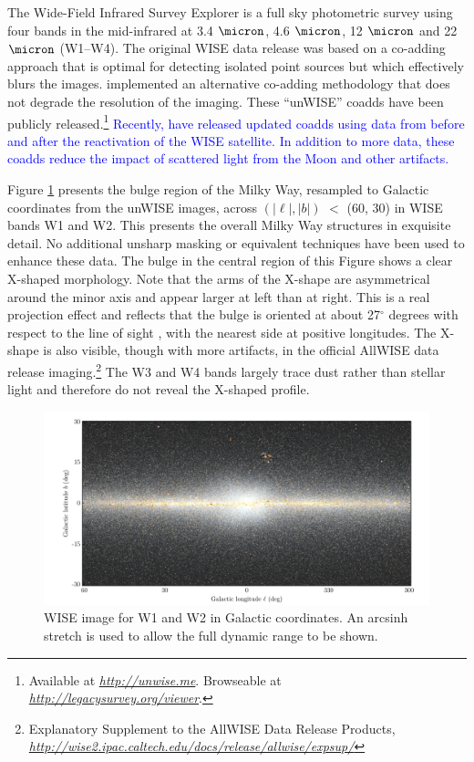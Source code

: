 \documentclass[12pt, preprint]{aastex}
\newcommand{\niceurl}[1]{\href{#1}{\textsl{#1}}}
\newcommand{\viewerurl}{\niceurl{http://legacysurvey.org/viewer}}
\begin{document}
The Wide-Field Infrared Survey Explorer \citep[WISE;][]{W2010} is a full sky photometric survey using four bands in the mid-infrared at 3.4 $\micron$, 4.6 $\micron$, 12 $\micron$ and 22 $\micron$ (W1--W4). The original WISE data release was based on a co-adding approach that is optimal for detecting isolated point sources but which effectively blurs the images. \citet{Lang2014a} implemented an alternative co-adding methodology that does not degrade the resolution of the imaging.  These ``unWISE'' coadds have been publicly released.\footnote{Available at \niceurl{http://unwise.me}. Browseable at \viewerurl.}  \textcolor{blue}{Recently, \citet{Meisner2016} have released updated coadds using data from before and after the reactivation of the WISE satellite.  In addition to more data, these coadds reduce the impact of scattered light from the Moon and other artifacts.}

Figure \ref{fig:xbulge} presents the bulge region of the Milky Way,  resampled to Galactic coordinates from the unWISE images, across $(|\ell|,|b|)$ $<$ (60, 30) in WISE bands W1 and W2.  This presents the overall Milky Way structures in exquisite detail.
No additional unsharp masking or equivalent techniques have been used to enhance these data. The bulge in the central region of this Figure shows a clear X-shaped morphology. Note that the arms of the X-shape are asymmetrical around the minor axis and appear larger at left than at right. This is a real projection effect and reflects that the bulge is oriented at about 27$^\circ$ degrees with respect to the line of sight \citep{Wegg2013}, with the nearest side at positive longitudes. The X-shape is also visible, though with more artifacts, in the official AllWISE data release imaging.\footnote{Explanatory
  Supplement to the AllWISE Data Release Products, 
  \niceurl{http://wise2.ipac.caltech.edu/docs/release/allwise/expsup/}}
%
The W3 and W4 bands largely trace dust rather than stellar light and therefore
do not reveal the X-shaped profile.

\begin{figure}[h!]
\centering
        \includegraphics[width=\textwidth]{xbulge-00}
\caption{WISE image for W1 and W2 in Galactic coordinates.  An arcsinh
  stretch is used to allow the full dynamic range to be shown.}
\label{fig:xbulge}
\end{figure}
\end{document}
